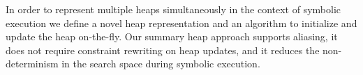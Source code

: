 
In order to represent multiple heaps simultaneously in the context of
symbolic execution we define a novel heap representation and an
algorithm to initialize and update the heap on-the-fly. Our summary
heap approach supports aliasing, it does not require constraint
rewriting on heap updates, and it reduces the non-determinism in the
search space during symbolic execution.

